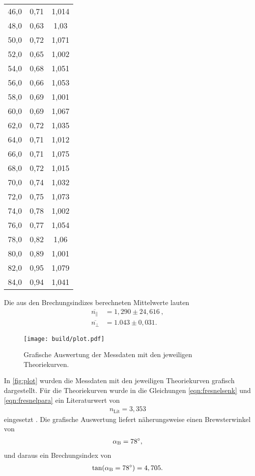 \begin{table}[H]
\begin{tabular}{c c c}
        46,0  &  0,71  &  1,014  \\
        48,0  &  0,63  &  1,03  \\
        50,0  &  0,72  &  1,071  \\
        52,0  &  0,65  &  1,002  \\
        54,0  &  0,68  &  1,051  \\
        56,0  &  0,66  &  1,053  \\
        58,0  &  0,69  &  1,001  \\
        60,0  &  0,69  &  1,067  \\
        62,0  &  0,72  &  1,035  \\
        64,0  &  0,71  &  1,012  \\
        66,0  &  0,71  &  1,075  \\
        68,0  &  0,72  &  1,015  \\
        70,0  &  0,74  &  1,032  \\
        72,0  &  0,75  &  1,073  \\
        74,0  &  0,78  &  1,002  \\
        76,0  &  0,77  &  1,054  \\
        78,0  &  0,82  &  1,06  \\
        80,0  &  0,89  &  1,001  \\
        82,0  &  0,95  &  1,079  \\
        84,0  &  0,94  &  1,041  \\
        \bottomrule
    \end{tabular}
\end{table}


\noindent
Die aus den Brechungsindizes berechneten Mittelwerte lauten
\begin{align*}
    \overline{n_\parallel} &= 1,290 \pm 24,616 \ , \\
    \overline{n_\perp} &= 1.043 \pm 0,031.
\end{align*}


\begin{figure}[H]
    \centering
    \texttt{[image: build/plot.pdf]}
    \caption{Grafische Auswertung der Messdaten mit den jeweiligen Theoriekurven.}
    \label{fig:plot}
\end{figure}

\noindent
In \autoref{fig:plot} wurden die Messdaten mit den jeweiligen Theoriekurven grafisch dargestellt. Für die Theoriekurven wurde in die Gleichungen \eqref{eqn:fresnelsenk} und \eqref{eqn:fresnelpara}
ein Literaturwert von
\begin{align*}
    n_{\text{Lit}} = 3,353
\end{align*}
eingesetzt \cite{BrechSilizium}. Die grafische Auswertung liefert näherungsweise einen Brewsterwinkel von  
\begin{align*}
    \alpha_{\text B} = \SI{78}{\degree},
\end{align*}
und daraus ein Brechungsindex von 
\begin{align*}
    \tan(\alpha_{\text B} = \SI{78}{\degree}) = 4,705.
\end{align*}